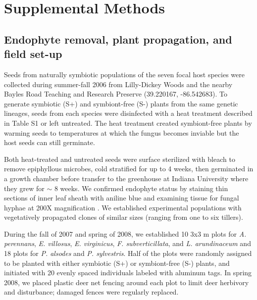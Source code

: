 \documentclass[lineno, sn-basic]{sn-jnl}%
\begin{document}
\newpage

\setcounter{myfigure}{0}








\section{Supplemental Methods}\label{SupMethods}

\renewcommand\theequation{S\arabic{equation}}   

\subsection{Endophyte removal, plant propagation, and field set-up}\label{SupMethods1}
Seeds from naturally symbiotic populations of the seven focal host species were collected during summer-fall 2006 from Lilly-Dickey Woods and the nearby Bayles Road Teaching and Research Preserve (39.220167, -86.542683). 
To generate symbiotic (S+) and symbiont-free (S-) plants from the same genetic lineages, seeds from each species were disinfected with a heat treatment described in Table S1 or left untreated. 
The heat treatment created symbiont-free plants by warming seeds to temperatures at which the fungus becomes inviable but the host seeds can still germinate.


Both heat-treated and untreated seeds were surface sterilized with bleach to remove epiphyllous microbes, cold stratified for up to 4 weeks, then germinated in a growth chamber before transfer to the greenhouse at Indiana University where they grew for $\sim$ 8 weeks. 
We confirmed endophyte status by staining thin sections of inner leaf sheath with aniline blue and examining tissue for fungal hyphae at 200X magnification \citep{bacon2018stains}. 
We established experimental populations with vegetatively propagated clones of similar sizes (ranging from one to six tillers). 

During the fall of 2007 and spring of 2008, we established 10 3x3 m plots for \emph{A. perennans}, \emph{E. villosus}, \emph{E. virginicus}, \emph{F. subverticillata}, and \emph{L. arundinaceum}  and 18 plots for \emph{P. alsodes} and \emph{P. sylvestris}.
Half of the plots were randomly assigned to be planted with either symbiotic (S+) or symbiont-free (S-) plants, and initiated with 20 evenly spaced individuals labeled with aluminum tags.
In spring 2008, we placed plastic deer net fencing around each plot to limit deer herbivory and disturbance; damaged fences were regularly replaced.
\end{document}
